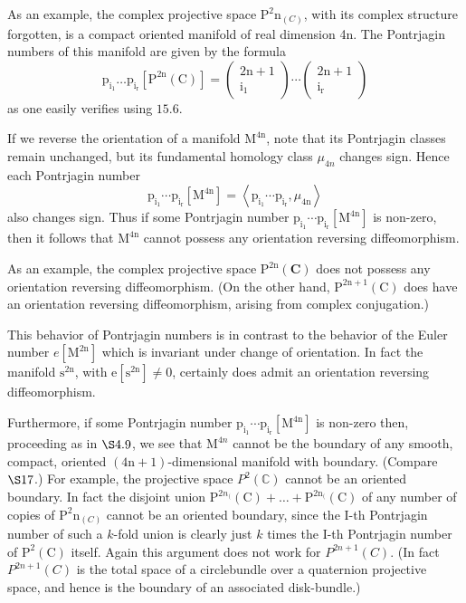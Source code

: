 \documentclass[10pt]{article}
\begin{document}
As an example, the complex projective space $\mathrm{P}^{2} \mathrm{n}_{(C)}$, with its complex structure forgotten, is a compact oriented manifold of real dimension 4n. The Pontrjagin numbers of this manifold are given by the formula
$$
\mathrm{p}_{\mathrm{i}_{1}} \ldots \mathrm{p}_{\mathrm{i}_{\mathrm{r}}}\left[\mathrm{P}^{2 \mathrm{n}}(\mathrm{C})\right]=\left(\begin{array}{c}
2 \mathrm{n}+1 \\
\mathrm{i}_{1}
\end{array}\right) \cdots\left(\begin{array}{c}
2 \mathrm{n}+1 \\
\mathrm{i}_{\mathrm{r}}
\end{array}\right)
$$
as one easily verifies using $15.6$.

If we reverse the orientation of a manifold $\mathrm{M}^{4 \mathrm{n}}$, note that its Pontrjagin classes remain unchanged, but its fundamental homology class $\mu_{4 n}$ changes sign. Hence each Pontrjagin number
$$
\mathrm{p}_{\mathrm{i}_{1}} \cdots \mathrm{p}_{\mathrm{i}_{\mathrm{r}}}\left[\mathrm{M}^{4 \mathrm{n}}\right]=\left\langle\mathrm{p}_{\mathrm{i}_{1}} \cdots \mathrm{p}_{\mathrm{i}_{\mathrm{r}}}, \mu_{4 \mathrm{n}}\right\rangle
$$
also changes sign. Thus if some Pontrjagin number $\mathrm{p}_{\mathrm{i}_{1}} \cdots \mathrm{p}_{\mathrm{i}_{\mathrm{r}}}\left[\mathrm{M}^{4 \mathrm{n}}\right]$ is non-zero, then it follows that $\mathrm{M}^{4 \mathrm{n}}$ cannot possess any orientation reversing diffeomorphism.

As an example, the complex projective space $\mathrm{P}^{2 \mathrm{n}}(\mathbf{C})$ does not possess any orientation reversing diffeomorphism. (On the other hand, $\mathrm{P}^{2 \mathrm{n}+1}(\mathrm{C})$ does have an orientation reversing diffeomorphism, arising from complex conjugation.)

This behavior of Pontrjagin numbers is in contrast to the behavior of the Euler number $e\left[\mathrm{M}^{2 \mathrm{n}}\right]$ which is invariant under change of orientation. In fact the manifold $\mathrm{s}^{2 \mathrm{n}}$, with $\mathrm{e}\left[\mathrm{s}^{2 \mathrm{n}}\right] \neq 0$, certainly does admit an orientation reversing diffeomorphism.

Furthermore, if some Pontrjagin number $\mathrm{p}_{\mathrm{i}_{1}} \cdots \mathrm{p}_{\mathrm{i}_{\mathrm{r}}}\left[\mathrm{M}^{4 \mathrm{n}}\right]$ is non-zero then, proceeding as in $\S 4.9$, we see that $\mathrm{M}^{4 n}$ cannot be the boundary of any smooth, compact, oriented $(4 \mathrm{n}+1)$-dimensional manifold with boundary. (Compare $\S 17$.) For example, the projective space $P^{2}(\mathbb{C})$ cannot be an oriented boundary. In fact the disjoint union $\mathrm{P}^{2 n_{(}}(\mathrm{C})+\ldots+\mathrm{P}^{2 \mathrm{n}_{(}}(\mathrm{C})$ of any number of copies of $\mathrm{P}^{2} \mathrm{n}_{(C)}$ cannot be an oriented boundary, since the I-th Pontrjagin number of such a $k$-fold union is clearly just $k$ times the I-th Pontrjagin number of $\mathrm{P}^{2}(\mathrm{C})$ itself. Again this argument does not work for $P^{2 n+1}(C)$. (In fact $P^{2 n+1}(C)$ is the total space of a circlebundle over a quaternion projective space, and hence is the boundary of an associated disk-bundle.)
\end{document}
